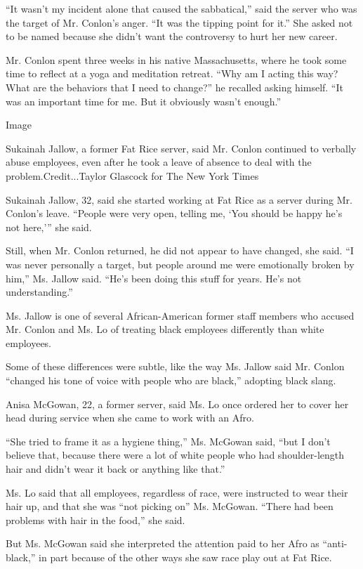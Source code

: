 ``It wasn't my incident alone that caused the sabbatical,'' said the
server who was the target of Mr. Conlon's anger. ``It was the tipping
point for it.'' She asked not to be named because she didn't want the
controversy to hurt her new career.

Mr. Conlon spent three weeks in his native Massachusetts, where he took
some time to reflect at a yoga and meditation retreat. ``Why am I acting
this way? What are the behaviors that I need to change?'' he recalled
asking himself. ``It was an important time for me. But it obviously
wasn't enough.''

Image

Sukainah Jallow, a former Fat Rice server, said Mr. Conlon continued to
verbally abuse employees, even after he took a leave of absence to deal
with the problem.Credit...Taylor Glascock for The New York Times

Sukainah Jallow, 32, said she started working at Fat Rice as a server
during Mr. Conlon's leave. ``People were very open, telling me, `You
should be happy he's not here,''' she said.

Still, when Mr. Conlon returned, he did not appear to have changed, she
said. ``I was never personally a target, but people around me were
emotionally broken by him,'' Ms. Jallow said. ``He's been doing this
stuff for years. He's not understanding.''

Ms. Jallow is one of several African-American former staff members who
accused Mr. Conlon and Ms. Lo of treating black employees differently
than white employees.

Some of these differences were subtle, like the way Ms. Jallow said Mr.
Conlon ``changed his tone of voice with people who are black,'' adopting
black slang.

Anisa McGowan, 22, a former server, said Ms. Lo once ordered her to
cover her head during service when she came to work with an Afro.

``She tried to frame it as a hygiene thing,'' Ms. McGowan said, ``but I
don't believe that, because there were a lot of white people who had
shoulder-length hair and didn't wear it back or anything like that.''

Ms. Lo said that all employees, regardless of race, were instructed to
wear their hair up, and that she was ``not picking on'' Ms. McGowan.
``There had been problems with hair in the food,'' she said.

But Ms. McGowan said she interpreted the attention paid to her Afro as
``anti-black,'' in part because of the other ways she saw race play out
at Fat Rice.

